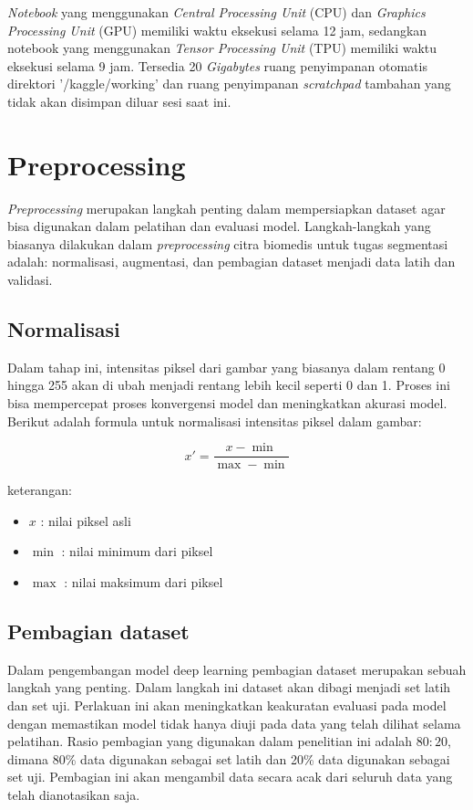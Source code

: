 \noindent \textit{Notebook} yang menggunakan \textit{Central Processing Unit }(CPU) dan \textit{Graphics Processing Unit} (GPU) memiliki waktu eksekusi selama 12 jam, sedangkan notebook yang menggunakan \textit{Tensor Processing Unit} (TPU) memiliki waktu eksekusi selama 9 jam. Tersedia 20 \textit{Gigabytes} ruang penyimpanan otomatis direktori '/kaggle/working' dan ruang penyimpanan \textit{scratchpad} tambahan yang tidak akan disimpan diluar sesi saat ini.


\section{Preprocessing}

\noindent \textit{Preprocessing} merupakan langkah penting dalam mempersiapkan dataset agar bisa digunakan dalam pelatihan dan evaluasi model. Langkah-langkah yang biasanya dilakukan dalam \textit{preprocessing} citra biomedis untuk tugas segmentasi adalah: normalisasi, augmentasi, dan pembagian dataset menjadi data latih dan validasi.

\subsection{Normalisasi}

\noindent Dalam tahap ini, intensitas piksel dari gambar yang biasanya dalam rentang 0 hingga 255 akan di ubah menjadi rentang lebih kecil seperti 0 dan 1. Proses ini bisa mempercepat proses konvergensi model dan meningkatkan akurasi model. Berikut adalah formula untuk normalisasi intensitas piksel dalam gambar:

\begin{equation}
	x' = \frac{x - \min}{\max - \min}
\end{equation}

\noindent
keterangan:
\begin{itemize}
	\item $x$ : nilai piksel asli
	\item $\min$ : nilai minimum dari piksel
	\item $\max$ : nilai maksimum dari piksel
\end{itemize}


\subsection{Pembagian dataset}

\noindent Dalam pengembangan model deep learning pembagian dataset merupakan sebuah langkah yang penting. Dalam langkah ini dataset akan dibagi menjadi set latih dan set uji. Perlakuan ini akan meningkatkan keakuratan evaluasi pada model dengan memastikan model tidak hanya diuji pada data yang telah dilihat selama pelatihan. Rasio pembagian yang digunakan dalam penelitian ini adalah \(80:20\), dimana 80\% data digunakan sebagai set latih dan 20\% data digunakan sebagai set uji. Pembagian ini akan mengambil data secara acak dari seluruh data yang telah dianotasikan saja. 

